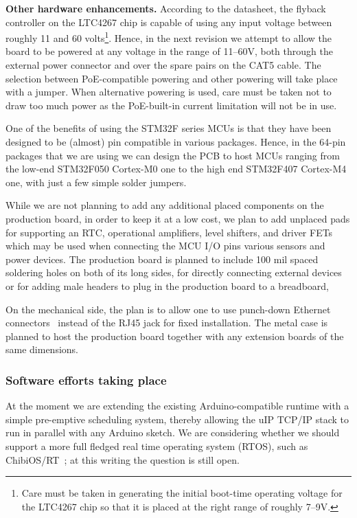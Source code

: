 \documentclass[final]{siamltex}
\begin{document}
{\bf Other hardware enhancements.}
According to the datasheet, the flyback controller on the LTC4267 chip
is capable of using any input voltage between roughly 11 and 60
volts\footnote{Care must be taken in generating the initial
boot-time operating voltage for the LTC4267 chip so that it is placed
at the right range of roughly 7--9V.}.  Hence, in the next revision we
attempt to allow the board to be powered at any voltage in the range
of 11--60V, both through the external power connector and over the
spare pairs on the CAT5 cable.  The selection between PoE-compatible
powering and other powering will take place with a jumper.  When
alternative powering is used, care must be taken not to draw too much
power as the PoE-built-in current limitation will not be in use.

One of the benefits of using the STM32F series MCUs is that they have
been designed to be (almost) pin compatible in various packages.
Hence, in the 64-pin packages that we are using we can design the PCB
to host MCUs ranging from the low-end STM32F050 Cortex-M0 one to the
high end STM32F407 Cortex-M4 one, with just a few simple solder
jumpers.

While we are not planning to add any additional placed components on
the production board, in order to keep it at a low cost, we plan to
add unplaced pads for supporting an RTC, operational amplifiers, level
shifters, and driver FETs which may be used when connecting the MCU
I/O pins various sensors and power devices.  The production board is
planned to include 100 mil spaced soldering holes on both of its long
sides, for directly connecting external devices or for adding male
headers to plug in the production board to a breadboard,

On the mechanical side, the plan is to allow one to use
punch-down Ethernet connectors~\cite{Krone} instead of the RJ45 jack
for fixed installation.  The metal case is planned to host the
production board together with any extension boards of the same
dimensions.

\subsubsection{Software efforts taking place}

At the moment we are extending the existing Arduino-compatible runtime
with a simple pre-emptive scheduling system, thereby allowing the uIP
TCP/IP stack to run in parallel with any Arduino sketch.  We are
considering whether we should support a more full fledged real time
operating system (RTOS), such as ChibiOS/RT~\cite{ChibiOS}; at this
writing the question is still open.
\end{document}
